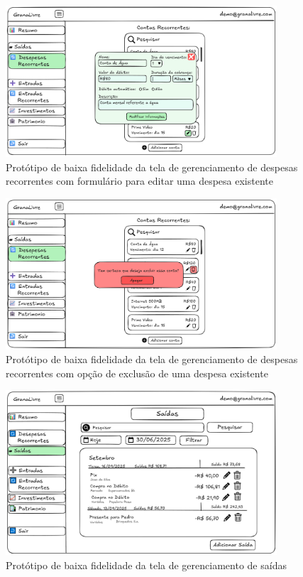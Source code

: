 \begin{figure}[H]
    \centering
    \includegraphics[width=0.9\textwidth]{imgs/04-despesas_recorrentes_3.png}
    \caption{Protótipo de baixa fidelidade da tela de gerenciamento de despesas recorrentes com formulário para editar uma despesa existente}
    \label{fig:prot_despesas_recorrentes3}
\end{figure}

\begin{figure}[H]
    \centering
    \includegraphics[width=0.9\textwidth]{imgs/04-despesas_recorrentes_4.png}
    \caption{Protótipo de baixa fidelidade da tela de gerenciamento de despesas recorrentes com opção de exclusão de uma despesa existente}
    \label{fig:prot_despesas_recorrentes4}
\end{figure}

\begin{figure}[H]
    \centering
    \includegraphics[width=0.9\textwidth]{imgs/05-saidas.png}
    \caption{Protótipo de baixa fidelidade da tela de gerenciamento de saídas}
    \label{fig:prot_saidax}
\end{figure}

